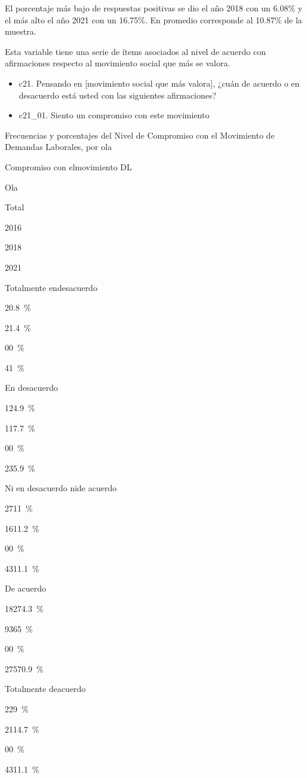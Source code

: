 \documentclass[
  12pt,
]{book}
\begin{document}
El porcentaje más bajo de respuestas positivas se dio el año 2018 con un 6.08\% y el más alto el año 2021 con un 16.75\%. En promedio corresponde al 10.87\% de la muestra.

Esta variable tiene una serie de ítems asociados al nivel de acuerdo con afirmaciones respecto al movimiento social que más se valora.

\begin{itemize}
\item
  c21. Pensando en {[}movimiento social que más valora{]}, ¿cuán de acuerdo o en desacuerdo está usted con las siguientes afirmaciones?
\item
  c21\_01. Siento un compromiso con este movimiento
\end{itemize}

Frecuencias y porcentajes del Nivel de Compromiso con el Movimiento de Demandas Laborales, por ola

Compromiso con elmovimiento DL

Ola

Total

2016

2018

2021

Totalmente endesacuerdo

{2}{0.8~\%}

{2}{1.4~\%}

{0}{0~\%}

{4}{1~\%}

En desacuerdo

{12}{4.9~\%}

{11}{7.7~\%}

{0}{0~\%}

{23}{5.9~\%}

Ni en desacuerdo nide acuerdo

{27}{11~\%}

{16}{11.2~\%}

{0}{0~\%}

{43}{11.1~\%}

De acuerdo

{182}{74.3~\%}

{93}{65~\%}

{0}{0~\%}

{275}{70.9~\%}

Totalmente deacuerdo

{22}{9~\%}

{21}{14.7~\%}

{0}{0~\%}

{43}{11.1~\%}
\end{document}
